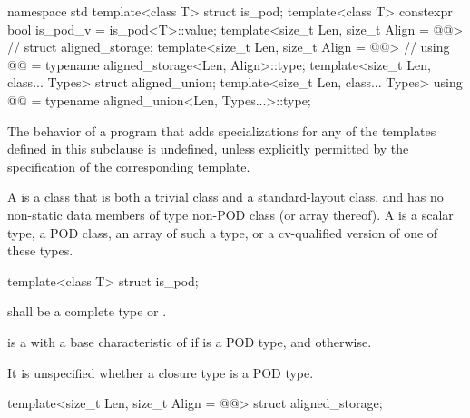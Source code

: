 \begin{codeblock}
namespace std {
  template<class T> struct is_pod;
  template<class T> constexpr bool is_pod_v = is_pod<T>::value;
  template<size_t Len, size_t Align = @@> // \seebelow
    struct aligned_storage;
  template<size_t Len, size_t Align = @@> // \seebelow
    using @@ = typename aligned_storage<Len, Align>::type;
  template<size_t Len, class... Types>
    struct aligned_union;
  template<size_t Len, class... Types>
    using @@ = typename aligned_union<Len, Types...>::type;
}
\end{codeblock}

\pnum
The behavior of a program that adds specializations for
any of the templates defined in this subclause is undefined,
unless explicitly permitted by the specification of the corresponding template.

\pnum
{}%
A  is a class that is both a trivial class and a
standard-layout class, and has no non-static data members of type non-POD class
(or array thereof). A  is a scalar type, a POD class, an array
of such a type, or a cv-qualified version of one of these types.

%
\begin{itemdecl}
template<class T> struct is_pod;
\end{itemdecl}

\begin{itemdescr}
\pnum
\expects
{} shall be a complete type or \cv{} .

\pnum
\remarks
{} is a 
with a base characteristic of 
if  is a POD type,
and  otherwise.

\pnum
\begin{note}
It is unspecified whether a closure type is a POD type.
\end{note}
\end{itemdescr}

%
\begin{itemdecl}
template<size_t Len, size_t Align = @@>
  struct aligned_storage;
\end{itemdecl}

